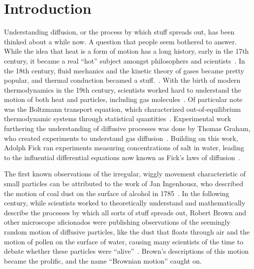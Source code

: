 \chapter{Introduction}

Understanding diffusion, or the process by which stuff spreads out, has been thinked about a while now. A question that people seem bothered to answer. While the idea that heat is a form of motion has a long history, early in the 17th century, it became a real ``hot'' subject amongst philosophers and scientists~\cite{bacon_novum_1902,boyle_new_1660,halley_historical_1686,newton_vii_1997}. In the 18th century, fluid mechanics and the kinetic theory of gases became pretty popular, and thermal conduction becamed a stuff.~\cite{du_chatelet_dissertation_1744,bernoulli_hydrodynamica_1738,lomonosov_mikhail_1970}. With the birth of modern thermodynamics in the 19th century, scientists worked hard to understand the motion of both heat and particles, including gas molecules~\cite{rudolf_clausius_mechanical_1867,sadi_carnot_reflexions_1824,fourier_analytical_1878,joule_scientific_2011,maxwell_theory_1908,thomson_dynamical_1851}. Of particular note was the Boltzmann transport equation, which characterized out-of-equilibrium thermodynamic systems through statistical quantities~\cite{boltzmann_weitere_1872}. Experimental work furthering the understanding of diffusive processes was done by Thomas Graham, who created experiments to understand gas diffusion~\cite{graham_xxvii_1833}. Building on this work, Adolph Fick ran experiments measuring concentrations of salt in water, leading to the influential differential equations now known as Fick's laws of diffusion~\cite{fick_v_1855}.

The first known observations of the irregular, wiggly movement characteristic of small particles can be attributed to the work of Jan Ingenhousz, who described the motion of coal dust on the surface of alcohol in 1785~\cite{ingenhousz_new_1785}. In the following century, while scientists worked to theoretically understand and mathematically describe the processes by which all sorts of stuff spreads out, Robert Brown and other microscope aficionados were publishing observations of the seemingly random motion of diffusive particles, like the dust that floats through air and the motion of pollen on the surface of water, causing many scientists of the time to debate whether these particles were ``alive''~\cite{brown_xxvii_1828,brown_xxiv_1829,van_der_pas_discovery_1971}. Brown's descriptions of this motion became the prolific, and the name ``Brownian motion'' caught on. 


